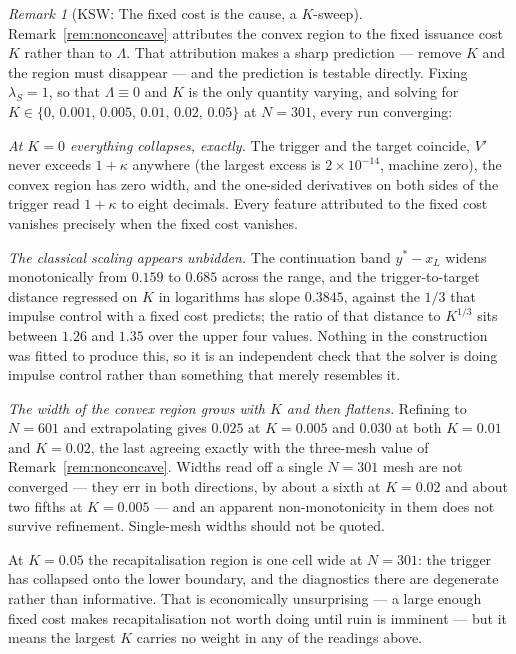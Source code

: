 \documentclass[11pt]{article}
\theoremstyle{remark}
\newtheorem{remark}{Remark}
\begin{document}
\begin{remark}[KSW: The fixed cost is the cause, a $K$-sweep]
\label{rem:Ksens}
Remark~\ref{rem:nonconcave} attributes the convex region to the fixed
issuance cost $K$ rather than to $\Lambda$. That attribution makes a sharp
prediction --- remove $K$ and the region must disappear --- and the
prediction is testable directly. Fixing $\lambda_S=1$, so that
$\Lambda\equiv0$ and $K$ is the only quantity varying, and solving for
$K \in \{0,\,0.001,\,0.005,\,0.01,\,0.02,\,0.05\}$ at $N=301$, every run
converging:

\emph{At $K=0$ everything collapses, exactly.} The trigger and the target
coincide, $V'$ never exceeds $1+\kappa$ anywhere (the largest excess is
$2\times10^{-14}$, machine zero), the convex region has zero width, and
the one-sided derivatives on both sides of the trigger read
$1+\kappa$ to eight decimals. Every feature attributed to the fixed cost
vanishes precisely when the fixed cost vanishes.

\emph{The classical scaling appears unbidden.} The continuation band
$y^*-x_L$ widens monotonically from $0.159$ to $0.685$ across the range,
and the trigger-to-target distance regressed on $K$ in logarithms has
slope $0.3845$, against the $1/3$ that impulse control with a fixed cost
predicts; the ratio of that distance to $K^{1/3}$ sits between $1.26$ and
$1.35$ over the upper four values. Nothing in the construction was fitted
to produce this, so it is an independent check that the solver is doing
impulse control rather than something that merely resembles it.

\emph{The width of the convex region grows with $K$ and then flattens.}
Refining to $N=601$ and extrapolating gives $0.025$ at $K=0.005$ and
$0.030$ at both $K=0.01$ and $K=0.02$, the last agreeing exactly with the
three-mesh value of Remark~\ref{rem:nonconcave}. Widths read off a
single $N=301$ mesh are not converged --- they err in both directions, by
about a sixth at $K=0.02$ and about two fifths at $K=0.005$ --- and an
apparent non-monotonicity in them does not survive refinement.
Single-mesh widths should not be quoted.

At $K=0.05$ the recapitalisation region is one cell wide at $N=301$: the
trigger has collapsed onto the lower boundary, and the diagnostics there
are degenerate rather than informative. That is economically unsurprising
--- a large enough fixed cost makes recapitalisation not worth doing until
ruin is imminent --- but it means the largest $K$ carries no weight in any
of the readings above.
\end{remark}
\end{document}
